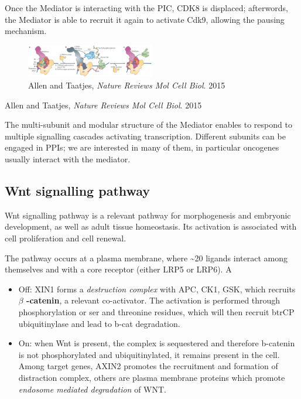 Once the Mediator is interacting with the PIC, CDK8 is displaced; afterwords, the Mediator is able to recruit it again to activate Cdk9, allowing the pausing mechanism.

\begin{figure}
\centering
\includegraphics[width=0.5\textwidth]{../_resources/Screenshot_2022-10-10_at_11-03-13.png}
\caption{Allen and Taatjes, \emph{Nature Reviews Mol Cell Biol}. 2015}
\end{figure}

Allen and Taatjes, \emph{Nature Reviews Mol Cell Biol}. 2015

The multi-subunit and modular structure of the Mediator enables to respond to multiple signalling cascades activating transcription. Different subunits can be engaged in PPIs; we are interested in many of them, in particular oncogenes usually interact with the mediator.

\hypertarget{wnt-signalling-pathway}{%
\subsection{Wnt signalling pathway}\label{wnt-signalling-pathway}}

Wnt signalling pathway is a relevant pathway for morphogenesis and embryonic development, as well as adult tissue homeostasis. Its activation is associated with cell proliferation and cell renewal.

The pathway occurs at a plasma membrane, where \textasciitilde20 ligands interact among themselves and with a core receptor (either LRP5 or LRP6). A

\begin{itemize}
\tightlist
\item
  Off: XIN1 forms a \emph{destruction complex} with APC, CK1, GSK, which recruits \textbf{$\beta$  -catenin}, a relevant co-activator. The activation is performed through phosphorylation or ser and threonine residues, which will then recruit btrCP ubiquitinylase and lead to b-cat degradation.
\item
  On: when Wnt is present, the complex is sequestered and therefore b-catenin is not phosphorylated and ubiquitinylated, it remains present in the cell. Among target genes, AXIN2 promotes the recruitment and formation of distraction complex, others are plasma membrane proteins which promote \emph{endosome mediated degradation} of WNT.
\end{itemize}

